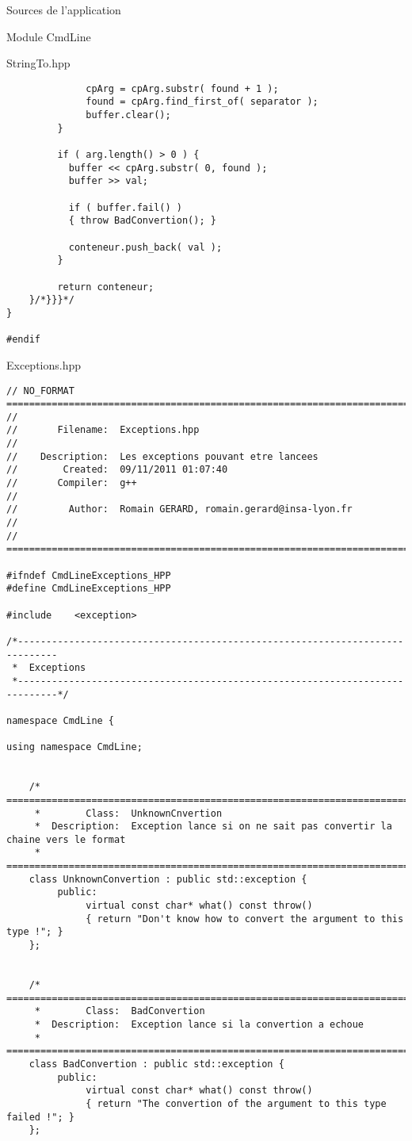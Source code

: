\documentclass{article}
\begin{document}
\begin{section}{Sources de l'application}
\begin{subsection}{Module CmdLine}
\begin{paragraph}{StringTo.hpp}
\begin{verbatim}
              cpArg = cpArg.substr( found + 1 );
              found = cpArg.find_first_of( separator );
              buffer.clear();
         }

         if ( arg.length() > 0 ) {
           buffer << cpArg.substr( 0, found );
           buffer >> val;

           if ( buffer.fail() )
           { throw BadConvertion(); }
           
           conteneur.push_back( val );
         }

         return conteneur;
    }/*}}}*/
}

#endif
  \end{verbatim}
  \end{paragraph}


\newpage
  \begin{paragraph}{Exceptions.hpp}
   \begin{verbatim}
// NO_FORMAT ===========================================================================
// 
//       Filename:  Exceptions.hpp
// 
//    Description:  Les exceptions pouvant etre lancees
//        Created:  09/11/2011 01:07:40
//       Compiler:  g++
// 
//         Author:  Romain GERARD, romain.gerard@insa-lyon.fr
// 
// =====================================================================================

#ifndef CmdLineExceptions_HPP
#define CmdLineExceptions_HPP

#include	<exception>

/*-----------------------------------------------------------------------------
 *  Exceptions
 *-----------------------------------------------------------------------------*/

namespace CmdLine {

using namespace CmdLine;


    /* =====================================================================================
     *        Class:  UnknownCnvertion
     *  Description:  Exception lance si on ne sait pas convertir la chaine vers le format
     * =====================================================================================*/
    class UnknownConvertion : public std::exception {
         public:
              virtual const char* what() const throw()
              { return "Don't know how to convert the argument to this type !"; }
    };


    /* =====================================================================================
     *        Class:  BadConvertion
     *  Description:  Exception lance si la convertion a echoue
     * =====================================================================================*/
    class BadConvertion : public std::exception {
         public:
              virtual const char* what() const throw()
              { return "The convertion of the argument to this type failed !"; }
    };



\end{verbatim}
\end{paragraph}
\end{subsection}
\end{section}
\end{document}
